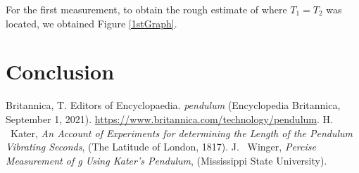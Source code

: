 \documentclass[aps,prl,10pt,twocolumn,floatfix]{revtex4-2}
\begin{document}
For the first measurement, to obtain the rough estimate of where $T_1=T_2$ was located, we obtained Figure \ref{1stGraph}. 

\section{Conclusion}


\begin{thebibliography}{9}
 Britannica, T. Editors of Encyclopaedia. \textit{pendulum} (Encyclopedia Britannica, September 1, 2021). \url{https://www.britannica.com/technology/pendulum}.
 H. ~Kater, \textit{An Account of Experiments for determining the Length of the Pendulum Vibrating Seconds}, (The Latitude of London, 1817).
 J. ~Winger, \textit{Percise Measurement of g Using Kater’s Pendulum}, (Mississippi State University).
\end{thebibliography}
\end{document}
